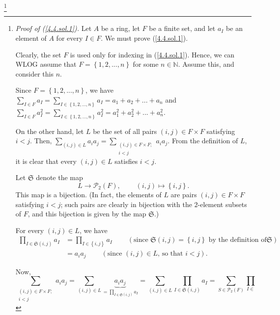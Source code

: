 \documentclass[numbers=enddot,12pt,final,onecolumn,notitlepage]{scrartcl}%
\begin{document}
\footnote{\textit{Proof of (\ref{4.4.sol.1}).} Let $A$ be a ring, let $F$ be a
finite set, and let $a_{I}$ be an element of $A$ for every $I\in F$. We must
prove (\ref{4.4.sol.1}).
\par
Clearly, the set $F$ is used only for indexing in (\ref{4.4.sol.1}). Hence, we
can WLOG assume that $F=\left\{  1,2,...,n\right\}  $ for some $n\in
\mathbb{N}$. Assume this, and consider this $n$.
\par
Since $F=\left\{  1,2,...,n\right\}  $, we have $\sum\limits_{I\in F}%
a_{I}=\sum\limits_{I\in\left\{  1,2,...,n\right\}  }a_{I}=a_{1}+a_{2}%
+...+a_{n}$ and $\sum\limits_{I\in F}a_{I}^{2}=\sum\limits_{I\in\left\{
1,2,...,n\right\}  }a_{I}^{2}=a_{1}^{2}+a_{2}^{2}+...+a_{n}^{2}$.
\par
On the other hand, let $L$ be the set of all pairs $\left(  i,j\right)  \in
F\times F$ satisfying $i<j$. Then, $\sum\limits_{\left(  i,j\right)  \in
L}a_{i}a_{j}=\sum\limits_{\substack{\left(  i,j\right)  \in F\times
F;\\i<j}}a_{i}a_{j}$. From the definition of $L$, it is clear that every
$\left(  i,j\right)  \in L$ satisfies $i<j$.
\par
Let $\mathfrak{S}$ denote the map%
\[
L\rightarrow\mathcal{P}_{2}\left(  F\right)  ,\ \ \ \ \ \ \ \ \ \ \left(
i,j\right)  \mapsto\left\{  i,j\right\}  .
\]
This map is a bijection. (In fact, the elements of $L$ are pairs $\left(
i,j\right)  \in F\times F$ satisfying $i<j$; such pairs are clearly in
bijection with the $2$-element subsets of $F$, and this bijection is given by
the map $\mathfrak{S}$.)
\par
For every $\left(  i,j\right)  \in L$, we have%
\begin{align*}
\prod_{I\in\mathfrak{S}\left(  i,j\right)  }a_{I}  &  =\prod_{I\in\left\{
i,j\right\}  }a_{I}\ \ \ \ \ \ \ \ \ \ \left(  \text{since }\mathfrak{S}%
\left(  i,j\right)  =\left\{  i,j\right\}  \text{ by the definition of
}\mathfrak{S}\right) \\
&  =a_{i}a_{j}\ \ \ \ \ \ \ \ \ \ \left(  \text{since }\left(  i,j\right)  \in
L\text{, so that }i<j\right)  .
\end{align*}
\par
Now,%
\[
\sum\limits_{\substack{\left(  i,j\right)  \in F\times F;\\i<j}}a_{i}%
a_{j}=\sum\limits_{\left(  i,j\right)  \in L}\underbrace{a_{i}a_{j}}%
_{=\prod\limits_{I\in\mathfrak{S}\left(  i,j\right)  }a_{I}}=\sum
\limits_{\left(  i,j\right)  \in L}\prod_{I\in\mathfrak{S}\left(  i,j\right)
}a_{I}=\sum\limits_{S\in\mathcal{P}_{2}\left(  F\right)  }\prod\limits_{I\in
}\]}
\end{document}
